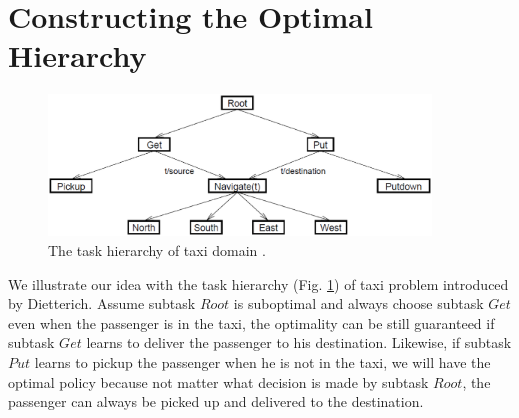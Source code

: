 \documentclass{article} %
\begin{document}


\section{Constructing the Optimal Hierarchy}
\begin{figure}[t]
\begin{center}
    \includegraphics[width=4in] {TaxiHierarchy.eps}
\end{center}
\caption{The task hierarchy of taxi domain \cite{MaxQJ}.}
\label{fig:taxi}
\end{figure}


We illustrate our idea with the task hierarchy (Fig. \ref{fig:taxi}) of taxi problem introduced by Dietterich\cite{MaxQJ}.
Assume subtask $Root$ is suboptimal and always choose subtask $Get$ even when 
the passenger is in the taxi, the optimality can be still guaranteed if subtask $Get$
learns to deliver the passenger to his destination.
Likewise, if subtask $Put$ learns to pickup the passenger when he is not in the taxi, 
we will have the optimal policy because not matter what decision is made 
by subtask $Root$, the passenger can always be picked up and delivered to the destination.
\end{document}
